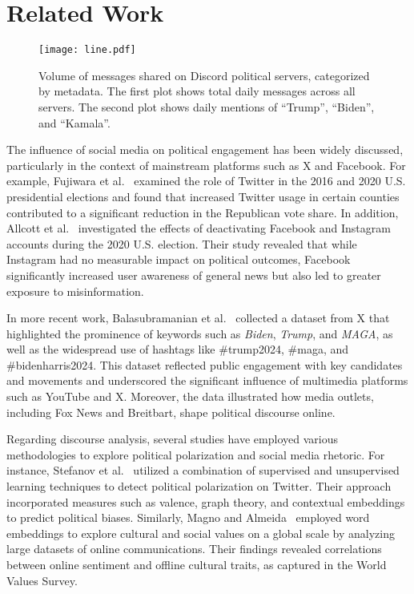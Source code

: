 \section{Related Work}
\label{sec:related_work}

\begin{figure*}[!ht]
    \centering
    \texttt{[image: line.pdf]}
    \caption{Volume of messages shared on Discord political servers, categorized by metadata. The first plot shows total daily messages across all servers. The second plot shows daily mentions of ``Trump'', ``Biden'', and ``Kamala''.}
    \label{fig:line-plot}
\end{figure*}


The influence of social media on political engagement has been widely discussed, particularly in the context of mainstream platforms such as X and Facebook. For example, Fujiwara et al.~\cite{fujiwara2024effect} examined the role of Twitter in the 2016 and 2020 U.S. presidential elections and found that increased Twitter usage in certain counties contributed to a significant reduction in the Republican vote share. In addition, Allcott et al.~\cite{allcott24theeffects} investigated the effects of deactivating Facebook and Instagram accounts during the 2020 U.S. election. Their study revealed that while Instagram had no measurable impact on political outcomes, Facebook significantly increased user awareness of general news but also led to greater exposure to misinformation.


In more recent work, Balasubramanian et al.~\cite{balasubramanian2024publicdatasettrackingsocial} collected a dataset from X that highlighted the prominence of keywords such as \emph{Biden}, \emph{Trump}, and \emph{MAGA}, as well as the widespread use of hashtags like \#trump2024, \#maga, and \#bidenharris2024. This dataset reflected public engagement with key candidates and movements and underscored the significant influence of multimedia platforms such as YouTube and X. Moreover, the data illustrated how media outlets, including Fox News and Breitbart, shape political discourse online.

Regarding discourse analysis, several studies have employed various methodologies to explore political polarization and social media rhetoric. For instance, Stefanov et al.~\cite{valence} utilized a combination of supervised and unsupervised learning techniques to detect political polarization on Twitter. Their approach incorporated measures such as valence, graph theory, and contextual embeddings to predict political biases. Similarly, Magno and Almeida~\cite{magno2021measuring} employed word embeddings to explore cultural and social values on a global scale by analyzing large datasets of online communications. Their findings revealed correlations between online sentiment and offline cultural traits, as captured in the World Values Survey.

